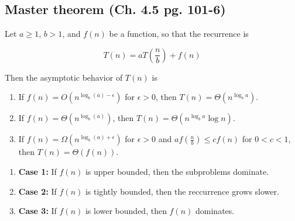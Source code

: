\subsection{Master theorem (Ch. 4.5 pg. 101-6)}
    \begin{theorem}
        Let \( a \geq 1 \), \( b > 1 \), and \( f(n) \) be a function, so that the recurrence is 

        \begin{equation}
            T(n) = aT\left(\frac{n}{b}\right) + f(n)
        \end{equation}

        Then the asymptotic behavior of \( T(n) \) is
        \begin{enumerate}
            \item If \( f(n) = O\left(n^{\log_b (a) - \epsilon}\right) \) for \( \epsilon > 0 \), then \( T(n) = \Theta\left(n^{\log_b a}\right) \).
            
            \item If \( f(n) = \Theta\left(n^{\log_b (a)}\right) \), then \( T(n) = \Theta\left(n^{\log_b a} \log n\right) \).
            
            \item If \( f(n) = \Omega\left(n^{\log_b (a) + \epsilon}\right) \) for \( \epsilon > 0 \) and \( af\left(\frac{n}{b}\right) \leq cf(n) \) for \( 0 < c < 1 \), then \( T(n) = \Theta(f(n)) \).
        \end{enumerate}
    \end{theorem}

    \begin{intuition}
        \begin{enumerate}
            \item \textbf{Case 1:} If $f(n)$ is upper bounded, then the subproblems dominate.
            \item \textbf{Case 2:} If $f(n)$ is tightly bounded, then the reccurrence grows slower.  
            \item \textbf{Case 3:} If $f(n)$ is lower bounded, then $f(n)$ dominates.
        \end{enumerate}
    \end{intuition}

